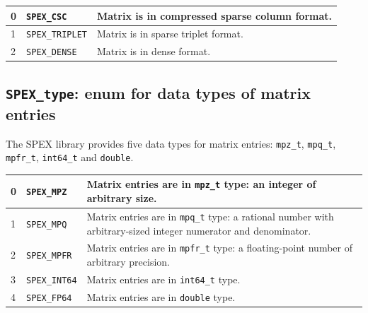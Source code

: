 \documentclass[12pt,oneside]{book}
\theoremstyle{definition}
\newenvironment{SizedCenteredTabular}[2][\small]
    {   
        #1\begin{center}\begin{tabular}{#2}
    }{ 
        \end{tabular}\end{center}
    }
\begin{document}
\begin{SizedCenteredTabular}{llp{4in}} \hline
        0 & \verb|SPEX_CSC| & Matrix is in compressed sparse column format. \\ \hline
        1 & \verb|SPEX_TRIPLET|      & Matrix is in sparse triplet format. \\ \hline
        2 & \verb|SPEX_DENSE|        & Matrix is in dense format.\\ \hline
\end{SizedCenteredTabular}


\subsection{\texttt{SPEX\_type}: enum for data types of matrix entries}
\label{ss:SPEX_type}
The SPEX library provides five data types for matrix entries: \verb|mpz_t|,
\verb|mpq_t|, \verb|mpfr_t|, \verb|int64_t| and \verb|double|.

\begin{SizedCenteredTabular}{llp{4in}} \hline
    0 & \verb|SPEX_MPZ|     & Matrix entries are in \verb|mpz_t| type: an integer
                              of arbitrary size. \\ \hline
    1 & \verb|SPEX_MPQ|     & Matrix entries are in \verb|mpq_t| type: a rational
                              number with arbitrary-sized integer numerator and
                              denominator. \\ \hline
    2 & \verb|SPEX_MPFR|    & Matrix entries are in \verb|mpfr_t| type: a
                              floating-point number of arbitrary precision. \\ \hline
    3 & \verb|SPEX_INT64|   & Matrix entries are in \verb|int64_t| type. \\ \hline
    4 & \verb|SPEX_FP64|    & Matrix entries are in \verb|double| type. \\ \hline
\end{SizedCenteredTabular}


\end{document}
